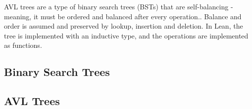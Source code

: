 AVL trees are a type of binary search trees (BSTs) that are self-balancing - meaning, it must be ordered and balanced after every operation.. Balance and order is assumed and preserved by lookup, insertion and deletion. In Lean, the tree is implemented with an inductive type, and the operations are implemented as functions.

\subsection{Binary Search Trees}
\label{sec:bst}


\subsection{AVL Trees}
